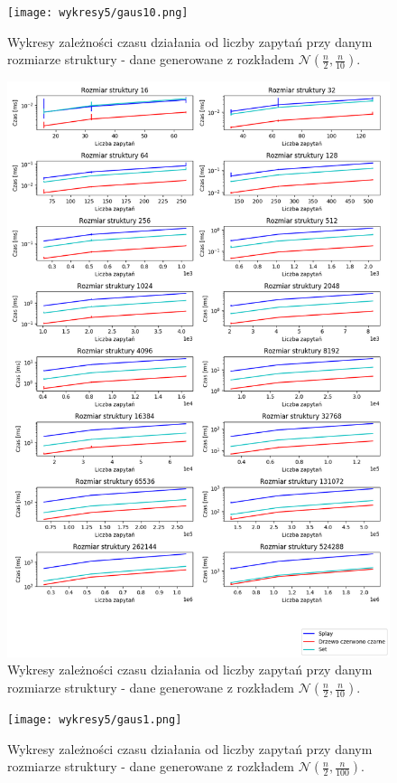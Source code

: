 \documentclass[declaration,shortabstract]{iithesis}
\theoremstyle{thm}
\theoremstyle{remark}
\theoremstyle{plain}
\theoremstyle{plain}
\theoremstyle{plain}
\begin{document}
\begin{figure}[H]  
\centering
    \texttt{[image: wykresy5/gaus10.png]}
      \caption{Wykresy zależności czasu działania od liczby zapytań przy danym rozmiarze struktury - dane generowane z rozkładem \(\mathcal{N}(\frac{n}{2}, \frac{n}{10})\). }  
\end{figure}

\begin{figure}[H]  
\centering
    \includegraphics[scale=0.45]{wykresy3/gaus10.png}
      \caption{Wykresy zależności czasu działania od liczby zapytań przy danym rozmiarze struktury - dane generowane z rozkładem \(\mathcal{N}(\frac{n}{2}, \frac{n}{10})\). }  
\end{figure}

\begin{figure}[H]  
\centering
    \texttt{[image: wykresy5/gaus1.png]}
      \caption{Wykresy zależności czasu działania od liczby zapytań przy danym rozmiarze struktury - dane generowane z rozkładem \(\mathcal{N}(\frac{n}{2}, \frac{n}{100})\). }  
\end{figure}
\end{document}
